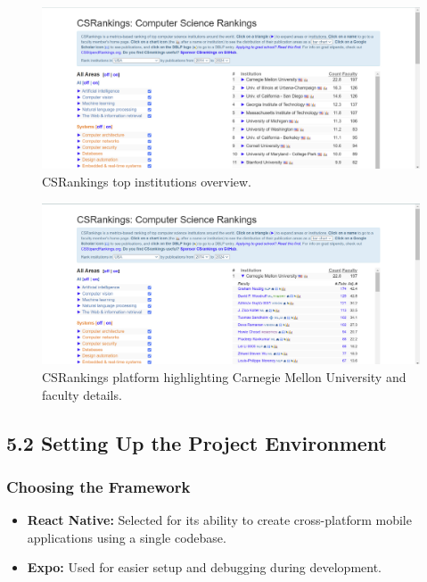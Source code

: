 \documentclass[12pt]{article}
\begin{document}
\begin{figure}[h]
    \centering
    \includegraphics[width=\textwidth]{csr.png} %
    \caption{CSRankings top institutions overview.}
    \label{fig:example_image}
\end{figure}

\begin{figure}[h]
    \centering
    \includegraphics[width=\textwidth]{csr2.png} %
    \caption{CSRankings platform highlighting Carnegie Mellon University and faculty details.}
    \label{fig:example_image}
\end{figure}

\subsection*{5.2 Setting Up the Project Environment}

\subsubsection*{Choosing the Framework}
\begin{itemize}
    \item \textbf{React Native:} Selected for its ability to create cross-platform mobile applications using a single codebase.
    \item \textbf{Expo:} Used for easier setup and debugging during development.
\end{itemize}
\end{document}
